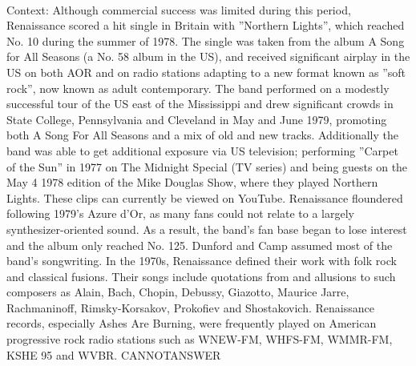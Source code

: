 \documentclass[11pt,a4paper, onecolumn]{article}
\begin{document}
\\ Context: Although commercial success was limited during this period, Renaissance scored a hit single in Britain with ''Northern Lights'', which reached No. 10 during the summer of 1978. The single was taken from the album A Song for All Seasons (a No. 58 album in the US), and received significant airplay in the US on both AOR and on radio stations adapting to a new format known as ''soft rock'', now known as adult contemporary. The band performed on a modestly successful tour of the US east of the Mississippi and drew significant crowds in State College, Pennsylvania and Cleveland in May and June 1979, promoting both A Song For All Seasons and a mix of old and new tracks. Additionally the band was able to get additional exposure via US television; performing ''Carpet of the Sun'' in 1977 on The Midnight Special (TV series) and being guests on the May 4 1978 edition of the Mike Douglas Show, where they played Northern Lights. These clips can currently be viewed on YouTube. Renaissance floundered following 1979's Azure d'Or, as many fans could not relate to a largely synthesizer-oriented sound. As a result, the band's fan base began to lose interest and the album only reached No. 125. Dunford and Camp assumed most of the band's songwriting. In the 1970s, Renaissance defined their work with folk rock and classical fusions. Their songs include quotations from and allusions to such composers as Alain, Bach, Chopin, Debussy, Giazotto, Maurice Jarre, Rachmaninoff, Rimsky-Korsakov, Prokofiev and Shostakovich. Renaissance records, especially Ashes Are Burning, were frequently played on American progressive rock radio stations such as WNEW-FM, WHFS-FM, WMMR-FM, KSHE 95 and WVBR. CANNOTANSWER
\end{document}
